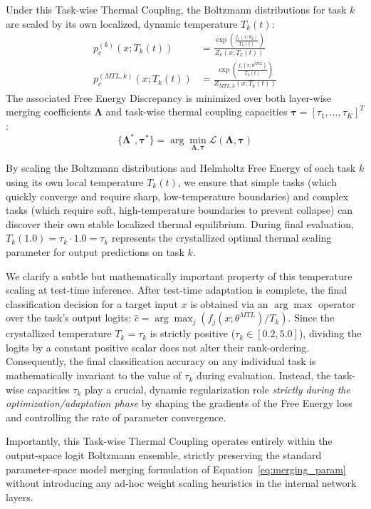 Under this Task-wise Thermal Coupling, the Boltzmann distributions for task $k$ are scaled by its own localized, dynamic temperature $T_k(t)$:
\begin{align}
p_c^{(k)}(x; T_k(t)) &= \frac{\exp\left( \frac{f_c(x; \theta_k)}{T_k(t)} \right)}{Z_k(x; T_k(t))} \\
p_c^{(MTL, k)}(x; T_k(t)) &= \frac{\exp\left( \frac{f_c(x; \theta^{MTL})}{T_k(t)} \right)}{Z_{MTL, k}(x; T_k(t))}
\end{align}
The associated Free Energy Discrepancy is minimized over both layer-wise merging coefficients $\boldsymbol{\Lambda}$ and task-wise thermal coupling capacities $\boldsymbol{\tau} = [\tau_1,\dots,\tau_K]^T$:
\begin{equation}
\{\boldsymbol{\Lambda}^*, \boldsymbol{\tau}^*\} = \arg\min_{\boldsymbol{\Lambda}, \boldsymbol{\tau}} \mathcal{L}(\boldsymbol{\Lambda}, \boldsymbol{\tau})
\end{equation}

By scaling the Boltzmann distributions and Helmholtz Free Energy of each task $k$ using its own local temperature $T_k(t)$, we ensure that simple tasks (which quickly converge and require sharp, low-temperature boundaries) and complex tasks (which require soft, high-temperature boundaries to prevent collapse) can discover their own stable localized thermal equilibrium. During final evaluation, $T_k(1.0) = \tau_k \cdot 1.0 = \tau_k$ represents the crystallized optimal thermal scaling parameter for output predictions on task $k$.

We clarify a subtle but mathematically important property of this temperature scaling at test-time inference. After test-time adaptation is complete, the final classification decision for a target input $x$ is obtained via an $\arg\max$ operator over the task's output logits: $\hat{c} = \arg\max_{j} \left( f_j(x; \theta^{MTL}) / T_k \right)$. Since the crystallized temperature $T_k = \tau_k$ is strictly positive ($\tau_k \in [0.2, 5.0]$), dividing the logits by a constant positive scalar does not alter their rank-ordering. Consequently, the final classification accuracy on any individual task is mathematically invariant to the value of $\tau_k$ during evaluation. Instead, the task-wise capacities $\tau_k$ play a crucial, dynamic regularization role \emph{strictly during the optimization/adaptation phase} by shaping the gradients of the Free Energy loss and controlling the rate of parameter convergence.

Importantly, this Task-wise Thermal Coupling operates entirely within the output-space logit Boltzmann ensemble, strictly preserving the standard parameter-space model merging formulation of Equation~\eqref{eq:merging_param} without introducing any ad-hoc weight scaling heuristics in the internal network layers.
